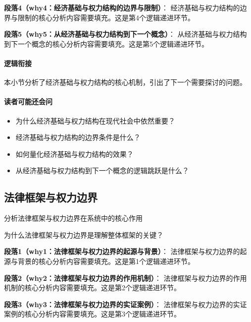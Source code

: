 \documentclass[../main.tex]{subfiles}
\begin{document}
\textbf{段落4（why4：经济基础与权力结构的边界与限制）}：
经济基础与权力结构的边界与限制的核心分析内容需要填充。这是第4个逻辑递进环节。


\textbf{段落5（why5：从经济基础与权力结构到下一个概念）}：
从经济基础与权力结构到下一个概念的核心分析内容需要填充。这是第5个逻辑递进环节。


\paragraph*{逻辑衔接}
本小节分析了经济基础与权力结构的核心机制，引出了下一个需要探讨的问题。

\paragraph*{读者可能还会问}
\begin{itemize}
\item 为什么经济基础与权力结构在现代社会中依然重要？
\item 经济基础与权力结构的边界条件是什么？
\item 如何量化经济基础与权力结构的效果？
\item 从经济基础与权力结构到下一个概念的逻辑跳跃是什么？
\end{itemize}


\subsection{法律框架与权力边界}

\begin{motivation}
分析法律框架与权力边界在系统中的核心作用
\end{motivation}

\begin{logicmap}
[逻辑链占位]
\end{logicmap}

\begin{questionbox}
为什么法律框架与权力边界是理解整体框架的关键？
\end{questionbox}

\textbf{段落1（why1：法律框架与权力边界的起源与背景）}：
法律框架与权力边界的起源与背景的核心分析内容需要填充。这是第1个逻辑递进环节。


\textbf{段落2（why2：法律框架与权力边界的作用机制）}：
法律框架与权力边界的作用机制的核心分析内容需要填充。这是第2个逻辑递进环节。


\textbf{段落3（why3：法律框架与权力边界的实证案例）}：
法律框架与权力边界的实证案例的核心分析内容需要填充。这是第3个逻辑递进环节。
\end{document}

